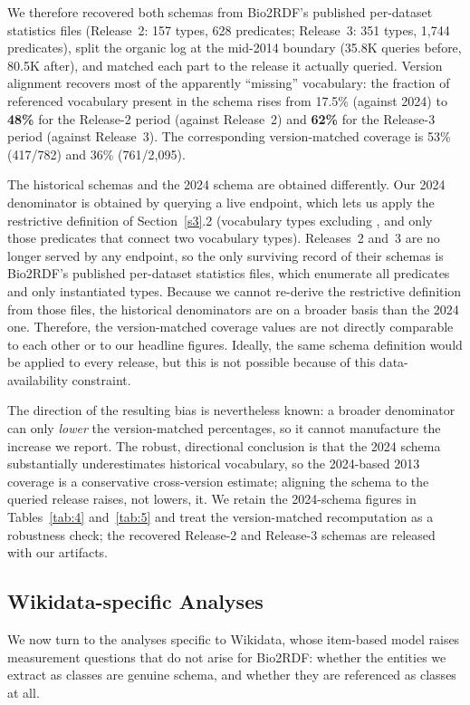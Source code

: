 \documentclass[sw]{iosart2x}
\begin{document}
We therefore recovered both schemas from Bio2RDF's published per-dataset statistics files (Release~2: 157 types, 628 predicates; Release~3: 351 types, 1{,}744 predicates), split the organic log at the mid-2014 boundary (35.8K queries before, 80.5K after), and matched each part to the release it actually queried. Version alignment recovers most of the apparently ``missing'' vocabulary: the fraction of referenced vocabulary present in the schema rises from 17.5\% (against 2024) to \textbf{48\%} for the Release-2 period (against Release~2) and \textbf{62\%} for the Release-3 period (against Release~3). The corresponding version-matched coverage is 53\% (417/782) and 36\% (761/2{,}095).

The historical schemas and the 2024 schema are obtained differently. Our 2024 denominator is obtained by querying a live endpoint, which lets us apply the restrictive definition of Section~\ref{s3}.2 (vocabulary types excluding \texttt{}, and only those predicates that connect two vocabulary types). Releases~2 and~3 are no longer served by any endpoint, so the only surviving record of their schemas is Bio2RDF's published per-dataset statistics files, which enumerate all predicates and only instantiated types. Because we cannot re-derive the restrictive definition from those files, the historical denominators are on a broader basis than the 2024 one. Therefore, the version-matched coverage values are not directly comparable to each other or to our headline figures. Ideally, the same schema definition would be applied to every release, but this is not possible because of this data-availability constraint.

The direction of the resulting bias is nevertheless known: a broader denominator can only \emph{lower} the version-matched percentages, so it cannot manufacture the increase we report. The robust, directional conclusion is that the 2024 schema substantially underestimates historical vocabulary, so the 2024-based 2013 coverage is a conservative cross-version estimate; aligning the schema to the queried release raises, not lowers, it. We retain the 2024-schema figures in Tables~\ref{tab:4} and~\ref{tab:5} and treat the version-matched recomputation as a robustness check; the recovered Release-2 and Release-3 schemas are released with our artifacts.


\subsection{Wikidata-specific Analyses}\label{sec:wdresults}
We now turn to the analyses specific to Wikidata, whose item-based model raises measurement questions that do not arise for Bio2RDF: whether the entities we extract as classes are genuine schema, and whether they are referenced as classes at all.
\end{document}
